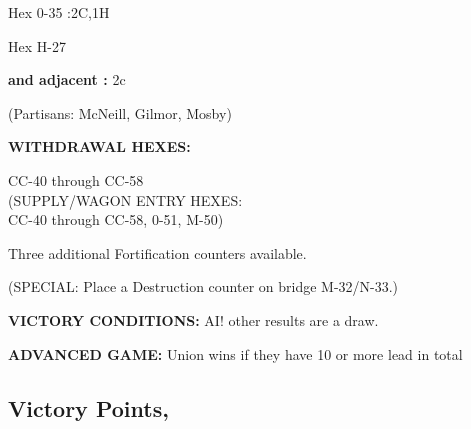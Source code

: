\begin{scenariodata}
Hex 0-35 :2C,1H\\
\end{scenariodata}

\begin{scenariodata}
Hex H-27\\
\end{scenariodata}

\begin{scenariodata}
\textbf{and adjacent :} 2c\\
\end{scenariodata}

\begin{scenariodata}
(Partisans: McNeill, Gilmor, Mosby)\\
\end{scenariodata}

\begin{scenariodata}
\textbf{WITHDRAWAL HEXES:}\\
\end{scenariodata}

\begin{scenariodata}
CC-40 through CC-58\\
(SUPPLY/WAGON ENTRY HEXES:\\
CC-40 through CC-58, 0-51, M-50)\\
\end{scenariodata}

Three additional Fortification counters available.

\begin{scenariodata}
(SPECIAL: Place a Destruction counter on bridge M-32/N-33.)\\
\end{scenariodata}

\begin{scenariodata}
\textbf{VICTORY CONDITIONS:} AI! other results are a draw.\\
\end{scenariodata}

\begin{scenariodata}
\textbf{ADVANCED GAME:} Union wins if they have 10 or more lead in total\\
\end{scenariodata}

\subsection*{Victory Points,}

